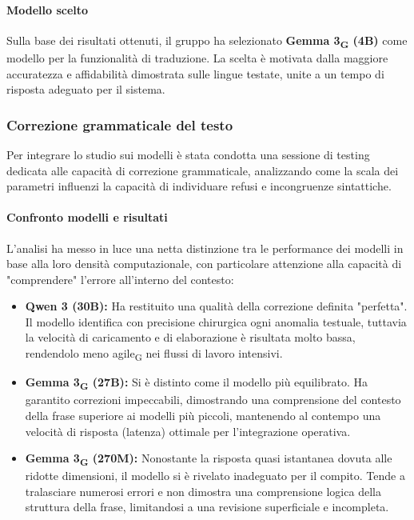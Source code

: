 \documentclass[11pt,a4paper]{article}
\newcommand{\gls}[1]{#1\textsubscript{G}}
\begin{document}
\paragraph{Modello scelto}
Sulla base dei risultati ottenuti, il gruppo ha selezionato \textbf{\gls{Gemma 3} (4B)} come modello per la funzionalità di traduzione. La scelta è motivata dalla maggiore accuratezza e affidabilità dimostrata sulle lingue testate, unite a un tempo di risposta adeguato per il sistema.


\subsubsection{Correzione grammaticale del testo}
 Per integrare lo studio sui modelli è stata condotta una sessione di testing dedicata alle capacità di correzione grammaticale, analizzando come la scala dei parametri influenzi la capacità di individuare refusi e incongruenze sintattiche.
 \paragraph{Confronto modelli e risultati}
 L'analisi ha messo in luce una netta distinzione tra le performance dei modelli in base alla loro densità computazionale, con particolare attenzione alla capacità di "comprendere" l'errore all'interno del contesto:
 
 \begin{itemize}
    \item \textbf{Qwen 3 (30B):} Ha restituito una qualità della correzione definita "perfetta". Il modello identifica con precisione chirurgica ogni anomalia testuale, tuttavia la velocità di caricamento e di elaborazione è risultata molto bassa, rendendolo meno \gls{agile} nei flussi di lavoro intensivi.
    
    \item \textbf{\gls{Gemma 3} (27B):} Si è distinto come il modello più equilibrato. Ha garantito correzioni impeccabili, dimostrando una comprensione del contesto della frase superiore ai modelli più piccoli, mantenendo al contempo una velocità di risposta (latenza) ottimale per l'integrazione operativa.
    
    \item \textbf{\gls{Gemma 3} (270M):} Nonostante la risposta quasi istantanea dovuta alle ridotte dimensioni, il modello si è rivelato inadeguato per il compito. Tende a tralasciare numerosi errori e non dimostra una comprensione logica della struttura della frase, limitandosi a una revisione superficiale e incompleta.
\end{itemize}
\end{document}
